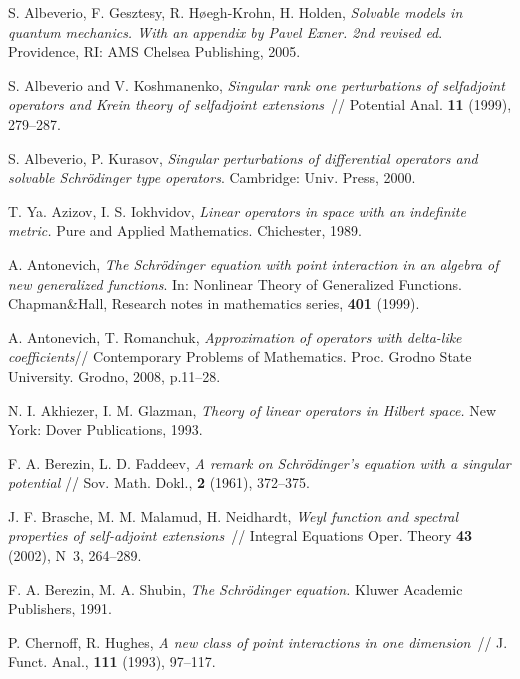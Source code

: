 \documentclass[11pt,english]{amsart}%
\begin{document}
\begin{thebibliography}{99}


 S. Albeverio,  F. Gesztesy,  R. H{\o}egh-Krohn,  H. Holden,
\textit{Solvable models in quantum mechanics. With an appendix by Pavel Exner. 2nd revised ed}.
Providence, RI: AMS Chelsea Publishing, 2005.

S. Albeverio and V. Koshmanenko, \textit{Singular rank one perturbations of selfadjoint
operators and Krein theory of selfadjoint extensions}~// Potential Anal. \textbf{11}
(1999), 279--287.

 S. Albeverio, P. Kurasov,  \textit{Singular perturbations of differential operators
and solvable Schr\"{o}dinger type operators}.  Cambridge: Univ. Press, 2000.


T. Ya. Azizov, I. S. Iokhvidov,  \textit{Linear operators in space with an indefinite metric.} Pure and Applied Mathematics. Chichester, 1989.


 A. Antonevich, \textit{The Schr\"{o}dinger
equation with point interaction in an algebra of new generalized functions}. In: Nonlinear
Theory of Generalized Functions. Chapman\&Hall, Research notes in mathematics series,
\textbf{401} (1999).

 A. Antonevich, T. Romanchuk, \textit{Approximation of operators with delta-like coefficients}// Contemporary Problems of Mathematics. Proc. Grodno State University. Grodno, 2008, p.11--28.





N. I. Akhiezer, I. M. Glazman, \textit{Theory of linear operators in Hilbert space.}
New York: Dover Publications, 1993.


F. A. Berezin, L. D. Faddeev, \textit{A remark on Schr\"odinger's equation with a singular potential} // Sov. Math. Dokl., \textbf{2} (1961), 372--375.

J. F. Brasche, M. M. Malamud, H. Neidhardt, \textit{Weyl function and spectral properties
of self-adjoint extensions}~// Integral Equations Oper. Theory \textbf{43} (2002), N~3,
264--289.


 F. A. Berezin, M. A. Shubin,
\textit{The Schr\"{o}dinger equation.} Kluwer Academic
Publishers, 1991.

  P. Chernoff,  R. Hughes, \textit{A new class of
point interactions in one dimension}~// J. Funct. Anal., \textbf{111} (1993), 97--117.




\end{thebibliography}
\end{document}
